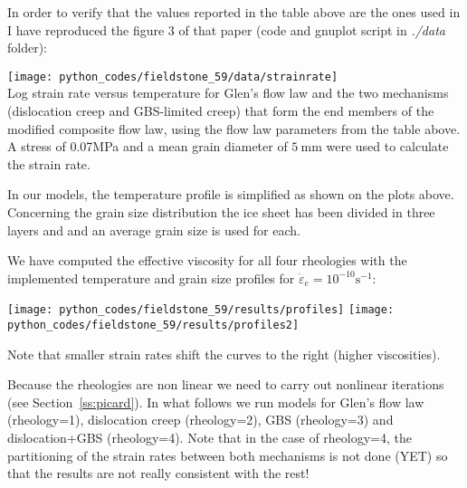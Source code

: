 In order to verify that the values reported in the table above are the ones 
used in \cite{kudd19} I have reproduced the figure 3 of that paper (code and gnuplot
script in {\sl ./data} folder):
\begin{center}
\texttt{[image: python\_codes/fieldstone\_59/data/strainrate]}\\
{\captionfont Log strain rate versus temperature for Glen's flow law and 
the two mechanisms (dislocation creep and GBS-limited creep) that form the end members 
of the modified composite flow law, using the flow law parameters from the table above. 
A stress of 0.07MPa and a mean grain diameter of $5~\si{\milli\meter}$ 
were used to calculate the strain rate.}
\end{center}


In our models, the temperature profile is simplified 
as shown on the plots above. 
Concerning the grain size distribution the ice sheet has been divided in three 
layers and and an average grain size is used for each.

We have computed the effective viscosity for all four rheologies with the 
implemented temperature and grain size profiles for $\dot{\varepsilon}_e=10^{-10}\text{s}^{-1}$:

\begin{center}
\texttt{[image: python\_codes/fieldstone\_59/results/profiles]}
\texttt{[image: python\_codes/fieldstone\_59/results/profiles2]}
\end{center}
Note that smaller strain rates shift the curves to the right (higher viscosities).



Because the rheologies are non linear we need to carry out nonlinear iterations (see Section~\ref{ss:picard}).
In what follows we run models for Glen's flow law (rheology=1), 
dislocation creep (rheology=2), GBS (rheology=3) and dislocation+GBS (rheology=4).
Note that in the case of rheology=4, the partitioning of the strain rates between both 
mechanisms is not done (YET) so that the results are not really consistent with the rest!

